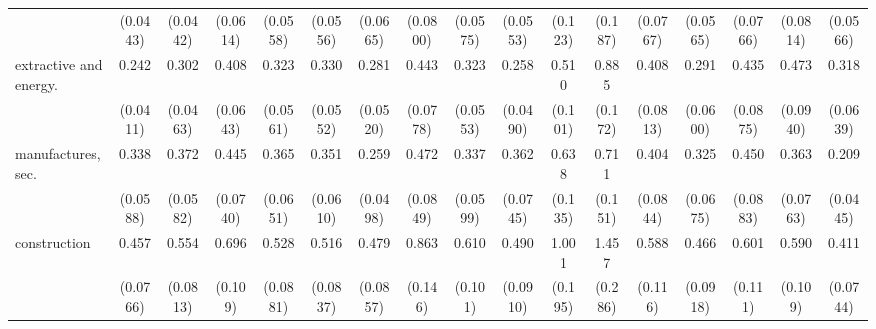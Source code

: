 {\begin{tabular}{l*{16}{c}}
                    &    (0.0443)         &    (0.0442)         &    (0.0614)         &    (0.0558)         &    (0.0556)         &    (0.0665)         &    (0.0800)         &    (0.0575)         &    (0.0553)         &     (0.123)         &     (0.187)         &    (0.0767)         &    (0.0565)         &    (0.0766)         &    (0.0814)         &    (0.0566)         \\
[1em]
extractive and energy.&       0.242\sym{***}&       0.302\sym{***}&       0.408\sym{***}&       0.323\sym{***}&       0.330\sym{***}&       0.281\sym{***}&       0.443\sym{***}&       0.323\sym{***}&       0.258\sym{***}&       0.510\sym{***}&       0.885         &       0.408\sym{***}&       0.291\sym{***}&       0.435\sym{***}&       0.473\sym{***}&       0.318\sym{***}\\
                    &    (0.0411)         &    (0.0463)         &    (0.0643)         &    (0.0561)         &    (0.0552)         &    (0.0520)         &    (0.0778)         &    (0.0553)         &    (0.0490)         &     (0.101)         &     (0.172)         &    (0.0813)         &    (0.0600)         &    (0.0875)         &    (0.0940)         &    (0.0639)         \\
[1em]
manufactures, sec.  &       0.338\sym{***}&       0.372\sym{***}&       0.445\sym{***}&       0.365\sym{***}&       0.351\sym{***}&       0.259\sym{***}&       0.472\sym{***}&       0.337\sym{***}&       0.362\sym{***}&       0.638\sym{*}  &       0.711         &       0.404\sym{***}&       0.325\sym{***}&       0.450\sym{***}&       0.363\sym{***}&       0.209\sym{***}\\
                    &    (0.0588)         &    (0.0582)         &    (0.0740)         &    (0.0651)         &    (0.0610)         &    (0.0498)         &    (0.0849)         &    (0.0599)         &    (0.0745)         &     (0.135)         &     (0.151)         &    (0.0844)         &    (0.0675)         &    (0.0883)         &    (0.0763)         &    (0.0445)         \\
[1em]
construction        &       0.457\sym{***}&       0.554\sym{***}&       0.696\sym{*}  &       0.528\sym{***}&       0.516\sym{***}&       0.479\sym{***}&       0.863         &       0.610\sym{**} &       0.490\sym{***}&       1.001         &       1.457         &       0.588\sym{**} &       0.466\sym{***}&       0.601\sym{**} &       0.590\sym{**} &       0.411\sym{***}\\
                    &    (0.0766)         &    (0.0813)         &     (0.109)         &    (0.0881)         &    (0.0837)         &    (0.0857)         &     (0.146)         &     (0.101)         &    (0.0910)         &     (0.195)         &     (0.286)         &     (0.116)         &    (0.0918)         &     (0.111)         &     (0.109)         &    (0.0744)         \\

\end{tabular}}

